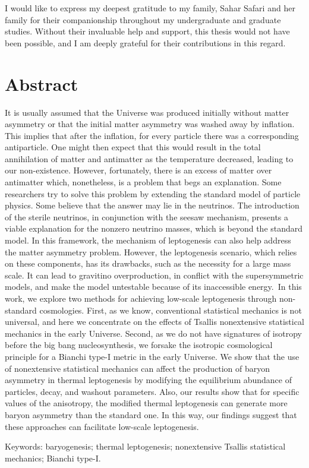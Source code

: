 \documentclass[a4paper]{book}
\begin{document}
	I would like to express my deepest gratitude to my family, Sahar Safari and her family for their companionship throughout my undergraduate and graduate studies. Without their invaluable help and support, this thesis would not have been possible, and I am deeply grateful for their contributions in this regard.
	
	\chapter*{Abstract}
	{It is usually assumed that the Universe was produced initially without matter asymmetry or that the initial matter asymmetry was washed away by inflation. This implies that after the inflation, for every particle there was a corresponding antiparticle. One might then expect that this would result in the total annihilation of matter and antimatter as the temperature decreased, leading to our non-existence. However, fortunately, there is an excess of matter over antimatter which, nonetheless, is a problem that begs an explanation. Some researchers try to solve this problem by extending the standard model of particle physics. Some believe that the answer may lie in the neutrinos. The introduction of the sterile neutrinos, in conjunction with the seesaw mechanism, presents a viable explanation for the nonzero neutrino masses, which is beyond the standard model. In this framework, the mechanism of leptogenesis can also help address the matter asymmetry problem. However, the leptogenesis scenario, which relies on these components, has its drawbacks, such as the necessity for a large mass scale. It can lead to gravitino overproduction, in conflict with the supersymmetric models, and make the model untestable because of its inaccessible energy. In this work, we explore two methods for achieving low-scale leptogenesis through non-standard cosmologies. First, as we know, conventional statistical mechanics is not universal, and here we concentrate on the effects of Tsallis nonextensive statistical mechanics in the early Universe. Second, as we do not have signatures of isotropy before the big bang nucleosynthesis, we forsake the isotropic cosmological principle for a Bianchi type-I metric in the early Universe. We show that the use of nonextensive statistical mechanics can affect the production of baryon asymmetry in thermal leptogenesis by modifying the equilibrium abundance of particles, decay, and washout parameters. َAlso, our results show that for specific values of the anisotropy, the modified thermal leptogenesis can generate more baryon asymmetry than the standard one. In this way, our findings suggest that these approaches can facilitate low-scale leptogenesis. \par}
	\noindent
	Keywords: baryogenesis; thermal leptogenesis; nonextensive Tsallis statistical mechanics; Bianchi type-I.
	
	
	
	
\end{document}
